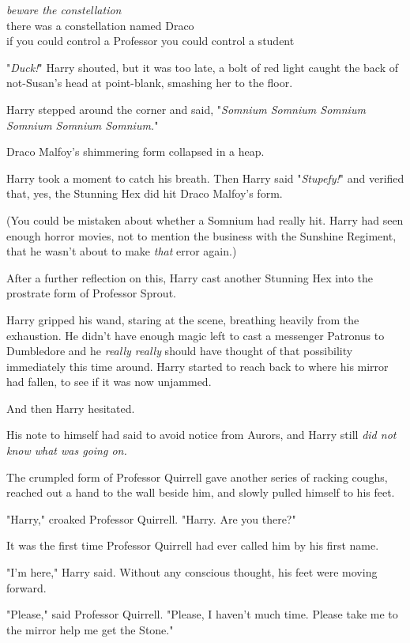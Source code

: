 \noindent{}\emph{beware the constellation}\\
there was a constellation named Draco\\
if you could control a Professor you could control a student

"\emph{Duck!}" Harry shouted, but it was too late, a bolt of red light caught
the back of not-Susan's head at point-blank, smashing her to the floor.

Harry stepped around the corner and said, "\emph{Somnium Somnium Somnium
Somnium Somnium Somnium.}"

Draco Malfoy's shimmering form collapsed in a heap.

Harry took a moment to catch his breath. Then Harry said "\emph{Stupefy!}" and
verified that, yes, the Stunning Hex did hit Draco Malfoy's form.

(You could be mistaken about whether a Somnium had really hit. Harry had seen
enough horror movies, not to mention the business with the Sunshine Regiment,
that he wasn't about to make \emph{that} error again.)

After a further reflection on this, Harry cast another Stunning Hex into the
prostrate form of Professor Sprout.

Harry gripped his wand, staring at the scene, breathing heavily from the
exhaustion. He didn't have enough magic left to cast a messenger Patronus to
Dumbledore and he \emph{really really} should have thought of that possibility
immediately this time around. Harry started to reach back to where his mirror
had fallen, to see if it was now unjammed.

And then Harry hesitated.

His note to himself had said to avoid notice from Aurors, and Harry still
\emph{did not know what was going on.}

The crumpled form of Professor Quirrell gave another series of racking coughs,
reached out a hand to the wall beside him, and slowly pulled himself to his
feet.

"Harry," croaked Professor Quirrell. "Harry. Are you there?"

It was the first time Professor Quirrell had ever called him by his first name.

"I'm here," Harry said. Without any conscious thought, his feet were moving
forward.

"Please," said Professor Quirrell. "Please, I haven't{\el} much time. Please
take me{\el} to the mirror{\el} help me{\el} get the Stone."

